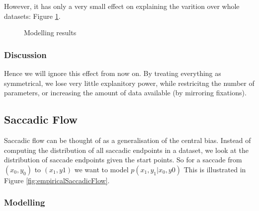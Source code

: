 \documentclass[a4paper, onecolumn, oneside, 11pt]{article}
\begin{document}
However, it has only a very small effect on explaining the varition over whole datasets: Figure \ref{fig:leftrightModelling}.

\begin{figure}
\centering
{}
\caption{Modelling results}
\label{fig:leftrightModelling}
\end{figure}

\subsubsection{Discussion}

Hence we will ignore this effect from now on. By treating everything as symmetrical, we lose very little explanitory power, while restricitng the number of parameters, or increasing the amount of data available (by mirroring fixations).

\subsection{Saccadic Flow}

Saccadic flow can be thought of as a generalisation of the central bias. Instead of computing the distribution of all saccadic endpoints in a dataset, we look at the distribution of saccade endpoints given the start points. So for a saccade from $(x_0, y_0)$ to $(x_1, y1)$ we want to model $p(x_1,y_1|x_0, y0)$ This is illustrated in Figure \ref{fig:empiricalSaccadicFlow}.

\subsubsection{Modelling}
\end{document}
